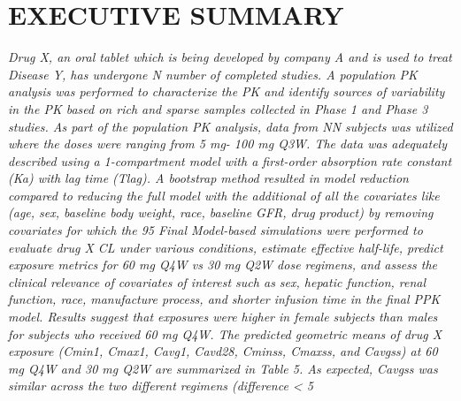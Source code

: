 \documentclass[
  letterpaper,
  toc=chapterentrywithdots,
  11pt,
  headings=small]{scrreprt}
\begin{document}

\chapter{EXECUTIVE SUMMARY}\label{sec-executive-summary}

\textit{{Drug X, an oral tablet which is being developed by company A and is used to treat Disease Y, has undergone N number of completed studies. A population PK analysis was performed to characterize the PK and identify sources of variability in the PK  based on rich and sparse samples collected in Phase 1 and Phase 3 studies. As part of the population PK analysis, data from NN subjects was utilized where the doses were ranging from 5 mg- 100 mg Q3W.
The data was adequately described using a 1-compartment model with a first-order absorption rate constant (Ka) with lag time (Tlag). A bootstrap method resulted in model reduction compared to reducing the full model with the additional of all the covariates like (age, sex, baseline body weight, race, baseline GFR, drug product)  by removing covariates for which the 95%
Final Model-based simulations were performed to evaluate drug X CL under various conditions, estimate effective half-life, predict exposure metrics for 60 mg Q4W vs 30 mg Q2W dose regimens, and assess the clinical relevance of covariates of interest such as sex, hepatic function, renal function, race, manufacture process, and shorter infusion time in the final PPK model. Results suggest that exposures were higher in female subjects than males for subjects who received 60 mg Q4W. The predicted geometric means of drug X exposure (Cmin1, Cmax1, Cavg1, Cavd28, Cminss, Cmaxss, and Cavgss) at 60 mg Q4W and 30 mg Q2W are summarized in Table 5.  As expected, Cavgss was similar across the two different regimens (difference < 5%
}}
\end{document}
